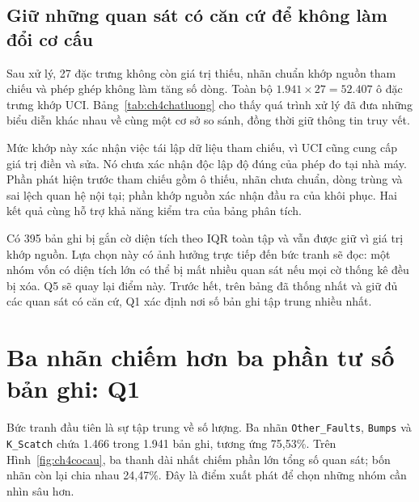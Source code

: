 \documentclass[12pt,a4paper,oneside]{report}
\newcommand{\maCot}[1]{{\urlstyle{tt}\def\UrlBreaks{\do\_\do\/\do\.}\def\UrlBigBreaks{}\nolinkurl{#1}}}
\begin{document}
\subsection{Giữ những quan sát có căn cứ để không làm đổi cơ cấu}

Sau xử lý, 27 đặc trưng không còn giá trị thiếu, nhãn chuẩn khớp nguồn tham chiếu và phép ghép không làm tăng số dòng. Toàn bộ $1.941\times27=52.407$ ô đặc trưng khớp UCI. Bảng~\ref{tab:ch4chatluong} cho thấy quá trình xử lý đã đưa những biểu diễn khác nhau về cùng một cơ sở so sánh, đồng thời giữ thông tin truy vết.

Mức khớp này xác nhận việc tái lập dữ liệu tham chiếu, vì UCI cũng cung cấp giá trị điền và sửa. Nó chưa xác nhận độc lập độ đúng của phép đo tại nhà máy. Phần phát hiện trước tham chiếu gồm ô thiếu, nhãn chưa chuẩn, dòng trùng và sai lệch quan hệ nội tại; phần khớp nguồn xác nhận đầu ra của khôi phục. Hai kết quả cùng hỗ trợ khả năng kiểm tra của bảng phân tích.

Có 395 bản ghi bị gắn cờ diện tích theo IQR toàn tập và vẫn được giữ vì giá trị khớp nguồn. Lựa chọn này có ảnh hưởng trực tiếp đến bức tranh sẽ đọc: một nhóm vốn có diện tích lớn có thể bị mất nhiều quan sát nếu mọi cờ thống kê đều bị xóa. Q5 sẽ quay lại điểm này. Trước hết, trên bảng đã thống nhất và giữ đủ các quan sát có căn cứ, Q1 xác định nơi số bản ghi tập trung nhiều nhất.

\section{Ba nhãn chiếm hơn ba phần tư số bản ghi: Q1}
\label{sec:ch4q1}

Bức tranh đầu tiên là sự tập trung về số lượng. Ba nhãn \maCot{Other_Faults}, \maCot{Bumps} và \maCot{K_Scatch} chứa 1.466 trong 1.941 bản ghi, tương ứng 75,53\%. Trên Hình~\ref{fig:ch4cocau}, ba thanh dài nhất chiếm phần lớn tổng số quan sát; bốn nhãn còn lại chia nhau 24,47\%. Đây là điểm xuất phát để chọn những nhóm cần nhìn sâu hơn.

\begin{center}\begin{minipage}{\linewidth}
\centering
{}
\label{fig:ch4cocau}
\end{minipage}\end{center}
\end{document}
